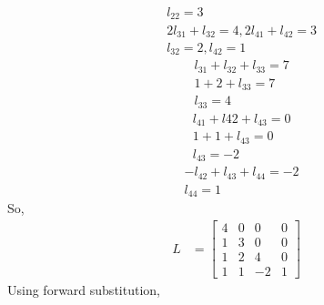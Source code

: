 \documentclass{report}
\begin{document}
{\begin{align*}
    &l_{22}=3 \\
    &2l_{31}+l_{32}=4 , 2l_{41}+l_{42} = 3\\
    &l_{32} = 2, l_{42} = 1
\end{align*}
\begin{align*}
    & l_{31}+l_{32}+l_{33} = 7\\
    & 1+2+l_{33} = 7\\
    &l_{33} = 4    
\end{align*}
\begin{align*}
    &l_{41}+l{42}+l_{43}=0\\
    &1+1+l_{43} = 0\\
    &l_{43} = -2
\end{align*}
\begin{align*}
    &-l_{42}+l_{43}+l_{44} = -2\\
    &l_{44}=1
\end{align*}
So,\\
\begin{align*}
    L &= \begin{bmatrix}
        4&0&0&0\\
        1&3&0&0\\
        1&2&4&0\\
        1&1&-2&1
    \end{bmatrix}
\end{align*}
Using forward substitution,

}
\end{document}

